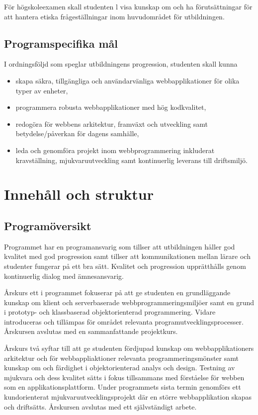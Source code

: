 \documentclass[swedish]{LnuCmThesis}
\begin{document}
För högskoleexamen skall studenten
l visa kunskap om och ha förutsättningar för att hantera etiska frågeställningar
inom huvudområdet för utbildningen.

\subsection*{Programspecifika mål}

I ordningsföljd som speglar utbildningens progression, studenten skall kunna

\begin{itemize}
    \item skapa säkra, tillgängliga och användarvänliga webbapplikationer för olika typer av enheter,
    \item programmera robusta webbapplikationer med hög kodkvalitet,
    \item redogöra för webbens arkitektur, framväxt och utveckling samt betydelse/påverkan för dagens samhälle,
    \item leda och genomföra projekt inom webbprogrammering inkluderat kravställning, mjukvaruutveckling samt kontinuerlig leverans till driftsmiljö.
\end{itemize}

\section*{Innehåll och struktur}

\subsection*{Programöversikt}

Programmet har en programansvarig som tillser att utbildningen håller god kvalitet med
god progression samt tillser att kommunikationen mellan lärare och studenter fungerar
på ett bra sätt. Kvalitet och progression upprätthålls genom kontinuerlig dialog med
ämnesansvarig.

Årskurs ett i programmet fokuserar på att ge studenten en grundläggande kunskap om
klient­ och serverbaserade webbprogrammeringsmiljöer samt en grund i prototyp­- och
klassbaserad objektorienterad programmering. Vidare introduceras och tillämpas för
området relevanta programutvecklingsprocesser. Årskursen avslutas med en
sammanfattande projektkurs.

Årskurs två syftar till att ge studenten fördjupad kunskap om webbapplikationers
arkitektur och för webbappliaktioner relevanta programmeringsmönster samt kunskap
om och färdighet i objektorienterad analys och design. Testning av mjukvara och dess
kvalitet sätts i fokus tillsammans med förståelse för webben som en applikationsplattform. Under programmets sista termin genomförs ett kundorienterat
mjukvaruutvecklingsprojekt där en större webbapplikation skapas och driftsätts.
Årskursen avslutas med ett självständigt arbete.
\end{document}
